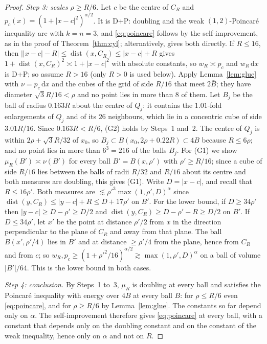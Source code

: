 \documentclass[11pt]{amsart}
\newcommand{\dd}{\,\mathrm{d}}
\newcommand{\abs}[1]{\lvert #1\rvert}
\DeclareMathOperator{\dist}{dist}
\theoremstyle{plain}
\theoremstyle{definition}
\theoremstyle{remark}
\begin{document}
\begin{proof}
\emph{Step 3: scales $\rho\ge R/6$.} Let $c$ be the centre of $C_R$ and
$p_c(x)=(1+\abs{x-c}^2)^{\alpha/2}$. It is D+P: doubling and the weak
$(1,2)$-Poincar\'e inequality are \cite[Prop.~6]{bjorn2001} with $k=n=3$, and
\eqref{eq:poincare} follows by the self-improvement, as in the proof of
Theorem~\ref{thm:cyl}; alternatively,
\cite[Prop.~4.9 with Thm.~2.7]{grigoryansaloffcoste2005} gives both directly.
If $R\le16$, then $\abs{\abs{x-c}-R}\le\dist(x,C_R)\le\abs{x-c}+R$ gives
$1+\dist(x,C_R)^2\asymp1+\abs{x-c}^2$ with absolute constants, so
$w_R\asymp p_c$ and $w_R\dd x$ is D+P; so assume $R>16$ (only $R>0$ is used
below). Apply Lemma~\ref{lem:glue} with $\nu=p_c\dd x$ and the cubes
of the grid of side $R/16$ that meet $2\bar B$; they have diameter
$\sqrt3R/16<\rho$ and no point lies in more than $8$ of them. Let $B_j$ be the
ball of radius $0.163R$ about the centre of $Q_j$: it contains the $1.01$-fold
enlargements of $Q_j$ and of its $26$ neighbours, which lie in a concentric
cube of side $3.01R/16$. Since $0.163R<R/6$, (G2) holds by Steps~1 and~2. The
centre of $Q_j$ is within $2\rho+\sqrt3R/32$ of $x_0$, so
$B_j\subset B(x_0,2\rho+0.22R)\subset4B$ because $R\le6\rho$; and no point lies
in more than $6^3=216$ of the balls $B_j$. For (G1) we show
$\mu_R(B')\asymp\nu(B')$ for every ball $B'=B(x,\rho')$ with $\rho'\ge R/16$;
since a cube of side $R/16$ lies between the balls of radii $R/32$ and $R/16$
about its centre and both measures are doubling, this gives (G1). Write
$D=\abs{x-c}$, and recall that $R\le16\rho'$. Both measures are
$\lesssim\rho'^3\max(1,\rho',D)^\alpha$ since
$\dist(y,C_R)\le\abs{y-c}+R\le D+17\rho'$ on $B'$. For the lower bound, if
$D\ge34\rho'$ then $\abs{y-c}\ge D-\rho'\ge D/2$ and
$\dist(y,C_R)\ge D-\rho'-R\ge D/2$ on $B'$. If $D\le34\rho'$, let $x'$ be the
point at distance $\rho'/2$ from $x$ in the direction perpendicular to the
plane of $C_R$ and away from that plane. The ball $B(x',\rho'/4)$ lies in $B'$
and at distance $\ge\rho'/4$ from the plane, hence from $C_R$ and from $c$; so
$w_R,p_c\ge(1+\rho'^2/16)^{\alpha/2}\gtrsim\max(1,\rho',D)^\alpha$ on a ball of
volume $\abs{B'}/64$. This is the lower bound in both cases.

\emph{Step 4: conclusion.} By Steps~1 to~3, $\mu_R$ is doubling at every ball
and satisfies the Poincar\'e inequality with energy over $4B$ at every ball
$B$: for $\rho\le R/6$ even \eqref{eq:poincare}, and for $\rho\ge R/6$ by
Lemma~\ref{lem:glue}. The constants so far depend only on $\alpha$. The
self-improvement therefore gives \eqref{eq:poincare} at every ball, with a
constant that depends only on the doubling constant and on the constant of
the weak inequality, hence only on $\alpha$ and not on $R$.
\end{proof}
\end{document}
